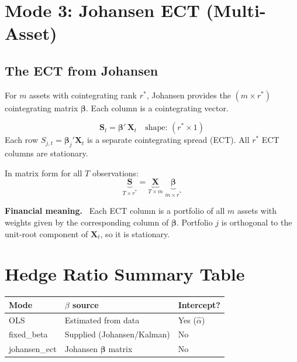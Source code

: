 \documentclass[10pt,a4paper,twocolumn]{article}
\begin{document}
\section{Mode 3: Johansen ECT (Multi-Asset)}

\subsection{The ECT from Johansen}

For $m$ assets with cointegrating rank $r^*$, Johansen provides the
$(m \times r^*)$ cointegrating matrix $\boldsymbol\beta$.  Each column is
a cointegrating vector.

\begin{tcolorbox}[mathbox={Formula 5 --- Johansen ECT Spread}]
\vspace{-4pt}
\begin{equation}\label{eq:ect}
  \mathbf{S}_t = \boldsymbol\beta'\,\mathbf{X}_t
  \quad\text{shape: } (r^* \times 1)
\end{equation}
\vspace{-2pt}
Each row $S_{j,t} = \boldsymbol\beta_j'\mathbf{X}_t$ is a separate
cointegrating spread (ECT).  All $r^*$ ECT columns are stationary.
\end{tcolorbox}

In matrix form for all $T$ observations:
\[
  \underbrace{\mathbf{S}}_{T \times r^*}
  = \underbrace{\mathbf{X}}_{T \times m}\;
    \underbrace{\boldsymbol\beta}_{m \times r^*}
\]

\noindent\textbf{Financial meaning.}~
Each ECT column is a portfolio of all $m$ assets with weights given by the
corresponding column of $\boldsymbol\beta$.  Portfolio $j$ is orthogonal
to the unit-root component of $\mathbf{X}_t$, so it is stationary.

\section{Hedge Ratio Summary Table}

\begin{center}
{\small
\begin{tabular}{@{}p{1.7cm}p{2.0cm}p{2.0cm}@{}}
\toprule
Mode & $\beta$ source & Intercept?\\
\midrule
OLS & Estimated from data & Yes ($\hat\alpha$)\\
fixed\_beta & Supplied (Johansen/Kalman) & No\\
johansen\_ect & Johansen $\boldsymbol\beta$ matrix & No\\
\bottomrule
\end{tabular}
}
\end{center}
\end{document}
